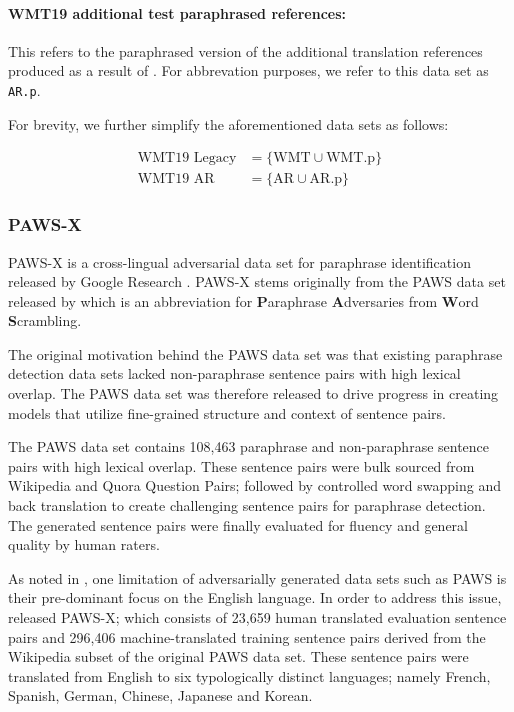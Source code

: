 \documentclass[11pt,a4paper]{article}
\begin{document}
\paragraph{WMT19 additional test paraphrased references:}This refers to the paraphrased version of the additional translation references produced as a result of \citet{freitag-bleu-paraphrase-references-2020}. For abbrevation purposes, we refer to this data set as \texttt{AR.p}.

For brevity, we further simplify the aforementioned data sets as follows:

\vspace{-10pt}
\begin{align}
  \text{WMT19 Legacy} &= \{\text{WMT} \cup \text{WMT.p} \} \\
  \text{WMT19 AR} &= \{\text{AR} \cup \text{AR.p} \}
\end{align}

\subsubsection{PAWS-X}

PAWS-X is a cross-lingual adversarial data set for paraphrase identification released by Google Research \citep{pawsx2019emnlp}. PAWS-X stems originally from the PAWS data set released by \citet{zhang2019paws} which is an abbreviation for \textbf{P}araphrase \textbf{A}dversaries from \textbf{W}ord \textbf{S}crambling.

The original motivation behind the PAWS data set was that existing paraphrase detection data sets lacked non-paraphrase sentence pairs with high lexical overlap. The PAWS data set was therefore released to drive progress in creating models that utilize fine-grained structure and context of sentence pairs.

The PAWS data set contains 108,463 paraphrase and non-paraphrase sentence pairs with high lexical overlap. These sentence pairs were bulk sourced from Wikipedia and Quora Question Pairs; followed by controlled word swapping and back translation to create challenging sentence pairs for paraphrase detection. The generated sentence pairs were finally evaluated for fluency and general quality by human raters.

As noted in \citet{pawsx2019emnlp}, one limitation of adversarially generated data sets such as PAWS is their pre-dominant focus on the English language. In order to address this issue, \citet{pawsx2019emnlp} released PAWS-X; which consists of 23,659 human translated evaluation sentence pairs and 296,406 machine-translated training sentence pairs derived from the Wikipedia subset of the original PAWS data set. These sentence pairs were translated from English to six typologically distinct languages; namely French, Spanish, German, Chinese, Japanese and Korean.
\end{document}
